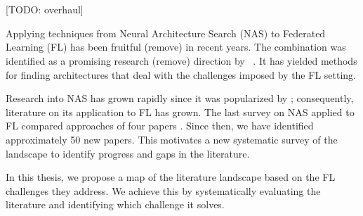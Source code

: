 \chapter{\abstractname}

[TODO: overhaul]

Applying techniques from Neural Architecture Search (NAS) to Federated Learning (FL) has been fruitful (remove) in recent years. The combination was identified as a promising research (remove) direction by ~\cite{fl_advances_and_open_problems_2021}. It has yielded methods for finding architectures that deal with the challenges imposed by the FL setting.






Research into NAS has grown rapidly \cite{nas_1000_papers_2023} since it was popularized by \cite{nas_with_rl_2017}; consequently, literature on its application to FL has grown. The last survey on NAS applied to FL compared approaches of four papers \cite{fl_to_nas_survey_2021}. Since then, we have identified approximately 50 new papers. This motivates a new systematic survey of the landscape to identify progress and gaps in the literature. 

In this thesis, we propose a map of the literature landscape based on the FL challenges they address. We achieve this by systematically evaluating the literature and identifying which challenge it solves. 

